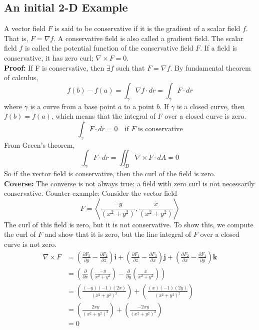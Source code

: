 \documentclass[a4paper]{article}
\begin{document}
\subsection{An initial 2-D Example}
A vector field $F$ is said to be conservative if it is the gradient of a scalar field $f$. That is, $F = \nabla f$. A conservative field is also called a gradient field. The scalar field $f$ is called the potential function of the conservative field $F$. If a field is conservative, it has zero curl;
\(
    \nabla \times F = 0   
\).\\
\textbf{Proof:} If F is conservative, then $\exists f$ such that $F = \nabla f$. By fundamental theorem of calculus, 
\[
    f(b)-f(a) = \int_{\gamma} \nabla f \cdot dr  = \int_{\gamma} F \cdot dr 
\]
where $\gamma$ is a curve from a base point $a$ to a  point $b$.
If $\gamma$ is a closed curve, then $f(b) = f(a)$, which means that the integral of $F$ over a closed curve is zero. 
\[
    \int_{\gamma} F \cdot dr = 0 \quad \text{if } F \text{ is conservative}  
\]
From Green's theorem,
\[
    \int_{\gamma} F \cdot dr = \iint_{D} \nabla \times F \cdot dA = 0
\]
So if the vector field is conservative, then the curl of the field is zero.\\
\textbf{Coverse:} The converse is not always true: a field with zero curl is not necessarily conservative.
Counter-example: Consider the vector field $$F = \left\langle \frac{-y}{(x^2+y^2)}, \frac{x}{(x^2+y^2)} \right\rangle$$
The curl of this field is zero, but it is not conservative. To show this, we compute the curl of $F$ and show that it is zero, but the line integral of $F$ over a closed curve is not zero. 
\begin{align*}
    \nabla \times F &= \left( \frac{\partial F_3}{\partial y} - \frac{\partial F_2}{\partial z} \right) \mathbf{i} + \left( \frac{\partial F_1}{\partial z} - \frac{\partial F_3}{\partial x} \right) \mathbf{j} + \left( \frac{\partial F_2}{\partial x} - \frac{\partial F_1}{\partial y} \right) \mathbf{k} \\
    &=  \left( \frac{\partial}{\partial x} \left( \frac{-y}{x^2+y^2} \right)  -  \frac{\partial}{\partial y} \left( \frac{x}{x^2+y^2} \right) \right) \\
    &= \left(\frac{(-y)(-1)(2x)}{(x^2 + y^2)^{2}}\right) + \left(\frac{(x)(-1)(2y)}{(x^2 + y^2)^{2}}\right)\\
    &= \left(\frac{2xy}{(x^2 + y^2)^{2}}\right) + \left(\frac{-2xy}{(x^2 + y^2)^{2}}\right)\\
    &= 0
\end{align*}
\end{document}
